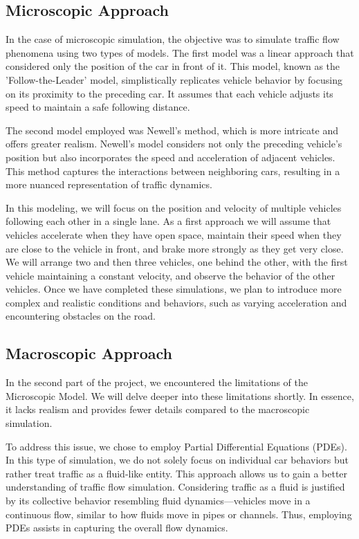 \documentclass{article}
\begin{document}
	\subsection{Microscopic Approach}
	
	
	In the case of microscopic simulation, the objective was to simulate traffic flow phenomena using two types of models.
	The first model was a linear approach that considered only the position of the car in front of it. This model, known as the 'Follow-the-Leader' model, simplistically replicates vehicle behavior by focusing on its proximity to the preceding car. It assumes that each vehicle adjusts its speed to maintain a safe following distance.
	
	The second model employed was Newell's method, which is more intricate and offers greater realism. Newell's model considers not only the preceding vehicle's position but also incorporates the speed and acceleration of adjacent vehicles. This method captures the interactions between neighboring cars, resulting in a more nuanced representation of traffic dynamics.
	\newline\newline
	
	 In this modeling, we will focus on the position and velocity of multiple vehicles following each other in a single lane. As a first approach we will assume that vehicles accelerate when they have open space, maintain their speed when they are close to the vehicle in front, and brake more strongly as they get very close. We will arrange two and then three vehicles, one behind the other, with the first vehicle maintaining a constant velocity, and observe the behavior of the other vehicles.
	 Once we have completed these simulations, we plan to introduce more complex and realistic conditions and behaviors, such as varying acceleration and encountering obstacles on the road.
	
	\subsection{Macroscopic Approach}
	
	In the second part of the project, we encountered the limitations of the Microscopic Model. We will delve deeper into these limitations shortly. In essence, it lacks realism and provides fewer details compared to the macroscopic simulation.
	
	To address this issue, we chose to employ Partial Differential Equations (PDEs). In this type of simulation, we do not solely focus on individual car behaviors but rather treat traffic as a fluid-like entity. This approach allows us to gain a better understanding of traffic flow simulation. Considering traffic as a fluid is justified by its collective behavior resembling fluid dynamics—vehicles move in a continuous flow, similar to how fluids move in pipes or channels. Thus, employing PDEs assists in capturing the overall flow dynamics.
	
\end{document}
